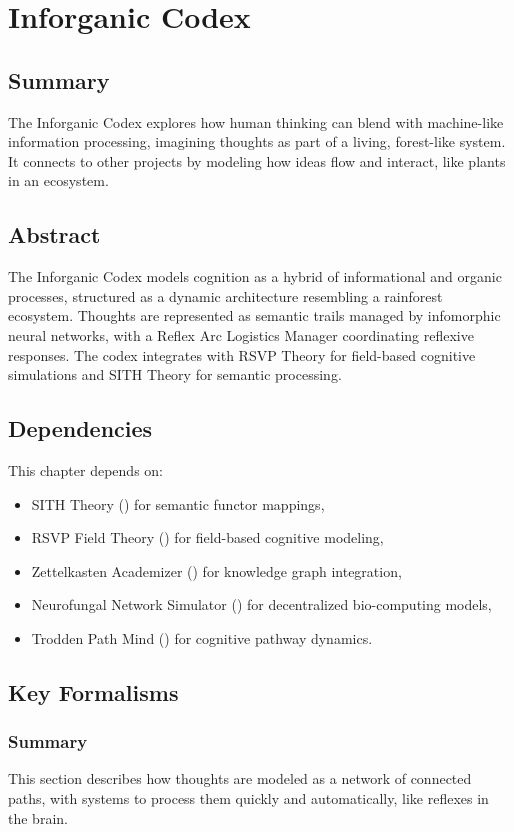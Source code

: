\documentclass[11pt,oneside]{memoir}
\theoremstyle{plain}
\begin{document}
\chapter{Inforganic Codex}
\label{sec:inforganic_codex}

\section{Summary}
The Inforganic Codex explores how human thinking can blend with machine-like information processing, imagining thoughts as part of a living, forest-like system. It connects to other projects by modeling how ideas flow and interact, like plants in an ecosystem.

\section{Abstract}
The Inforganic Codex models cognition as a hybrid of informational and organic processes, structured as a dynamic architecture resembling a rainforest ecosystem. Thoughts are represented as semantic trails managed by infomorphic neural networks, with a Reflex Arc Logistics Manager coordinating reflexive responses. The codex integrates with RSVP Theory for field-based cognitive simulations and SITH Theory for semantic processing.

\section{Dependencies}
This chapter depends on:
\begin{itemize}
    \item SITH Theory () for semantic functor mappings,
    \item RSVP Field Theory () for field-based cognitive modeling,
    \item Zettelkasten Academizer () for knowledge graph integration,
    \item Neurofungal Network Simulator () for decentralized bio-computing models,
    \item Trodden Path Mind () for cognitive pathway dynamics.
\end{itemize}

\section{Key Formalisms}
\subsection{Summary}
This section describes how thoughts are modeled as a network of connected paths, with systems to process them quickly and automatically, like reflexes in the brain.
\end{document}
